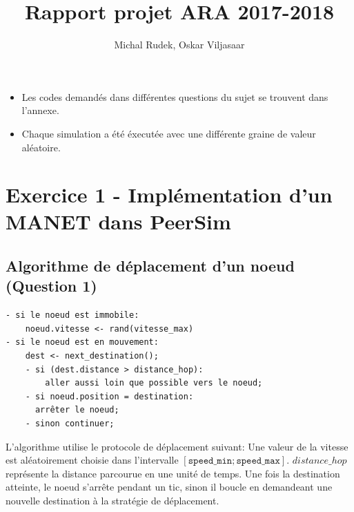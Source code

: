 \documentclass[a4paper]{article}
\title{Rapport projet ARA 2017-2018}
\author{Michal Rudek, Oskar Viljasaar}
\begin{document}
\maketitle


\tableofcontents

\vfill
\begin{itemize}
  \item Les codes demandés dans différentes questions du sujet se
    trouvent dans l'annexe.
  \item Chaque simulation a été éxecutée avec une différente graine de
    valeur aléatoire.
    \end{itemize}
\pagebreak
\section{Exercice 1 - Implémentation d'un MANET dans PeerSim}
\subsection{Algorithme de déplacement d'un noeud (Question 1)}

\begin{verbatim}
- si le noeud est immobile:
    noeud.vitesse <- rand(vitesse_max)
- si le noeud est en mouvement:
    dest <- next_destination();
    - si (dest.distance > distance_hop):
        aller aussi loin que possible vers le noeud;
    - si noeud.position = destination:
      arrêter le noeud;
    - sinon continuer;
\end{verbatim}
L'algorithme utilise le protocole de déplacement suivant:
Une valeur de la vitesse est aléatoirement choisie dans l'intervalle
$ \left[ \texttt{speed\_min}; \texttt{speed\_max} \right] $.
$distance\_hop$ représente la
distance parcourue en une unité de temps.
Une fois la destination atteinte, le noeud s'arrête pendant un tic,
sinon il boucle en demandeant une nouvelle destination à la
stratégie de déplacement.
\end{document}
